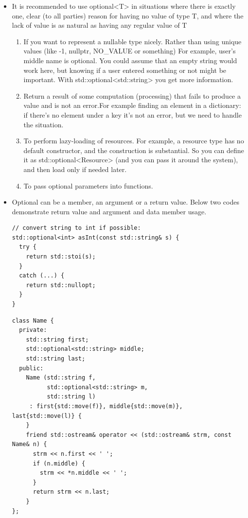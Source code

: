 \documentclass[a4paper,11pt,twoside]{book}
\begin{document}
\begin{itemize}
    \item It is recommended to use optional<T> in situations where there is exactly one, clear (to all parties) reason for having no value of type T, and where the lack of value is as natural as having any regular value of T

\begin{enumerate}
    \item  If you want to represent a nullable type nicely.
Rather than using unique values (like -1, nullptr, NO\_VALUE or something)
For example, user’s middle name is optional. You could assume that an empty string would work here, but knowing if a user entered something or not might be important. With std::optional<std::string> you get more information.

    \item Return a result of some computation (processing) that fails to produce a value and is not an error.For example finding an element in a dictionary: if there’s no element under a key it’s not an error, but we need to handle the situation.

    \item To perform lazy-loading of resources.
For example, a resource type has no default constructor, and the construction is substantial. So you can define it as std::optional<Resource> (and you can pass it around the system), and then load only if needed later.

    \item To pass optional parameters into functions.
\end{enumerate}

    \item Optional can be a member, an argument or a return value. Below two codes demonstrate return value and argument and data member usage. 

\begin{lstlisting}
// convert string to int if possible:
std::optional<int> asInt(const std::string& s) {
  try {
    return std::stoi(s);
  }
  catch (...) {
    return std::nullopt;
  }
}
\end{lstlisting}

\begin{lstlisting}
class Name {
  private:
    std::string first;
    std::optional<std::string> middle;
    std::string last;
  public:
    Name (std::string f,
          std::optional<std::string> m,
          std::string l)
     : first{std::move(f)}, middle{std::move(m)}, last{std::move(l)} {
    }
    friend std::ostream& operator << (std::ostream& strm, const Name& n) {
      strm << n.first << ' ';
      if (n.middle) {
        strm << *n.middle << ' ';
      }
      return strm << n.last;
    }
};


\end{lstlisting}
\end{itemize}
\end{document}
